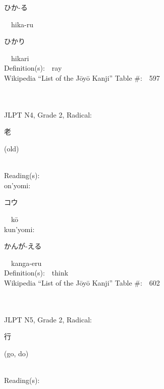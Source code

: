 \begin{multicols}{2}
{\hspace*{2em}}{\begin{CJK}{UTF8}{min} ひか-る \end{CJK}}\ \ hika-ru\ \ \\
{\hspace*{2em}}{\begin{CJK}{UTF8}{min} ひかり \end{CJK}}\ \ hikari\ \ \\
Definition(s):\ \ ray \\
Wikipedia ``List of the J\=oy\=o Kanji'' Table \#:\ \ 597 \\
\ \ \\
{\fontsize{34pt}{40pt}  }\ \ \\  %
{JLPT N4, Grade 2, Radical:\ \ {\begin{CJK}{UTF8}{min} 老 \end{CJK}} (old) } \\
Reading(s):\ \ \\
{\hspace*{1em}}on'yomi:\ \ \\
{\hspace*{2em}}{\begin{CJK}{UTF8}{min} コウ \end{CJK}}\ \ k\=o\ \ \\
{\hspace*{1em}}kun'yomi:\ \ \\
{\hspace*{2em}}{\begin{CJK}{UTF8}{min} かんが-える \end{CJK}}\ \ kanga-eru\ \ \\
Definition(s):\ \ think \\
Wikipedia ``List of the J\=oy\=o Kanji'' Table \#:\ \ 602 \\
\ \ \\
{\fontsize{34pt}{40pt}  }\ \ \\  %
{JLPT N5, Grade 2, Radical:\ \ {\begin{CJK}{UTF8}{min} 行 \end{CJK}} (go, do) } \\
Reading(s):\ \ \\

\end{multicols}
